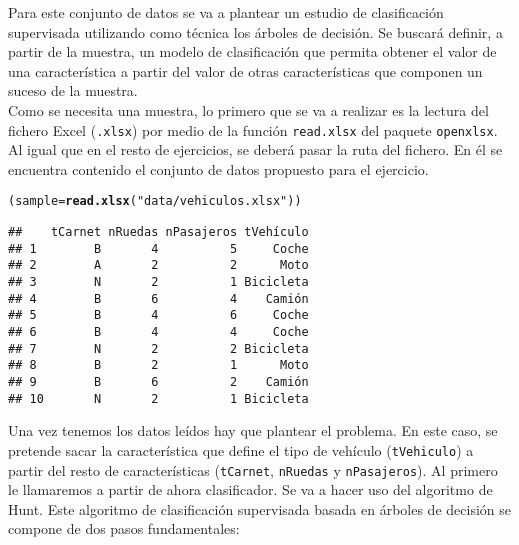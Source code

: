 \documentclass[12pt]{report}\usepackage[]{graphicx}\usepackage[dvipsnames]{xcolor}
\makeatletter
\newcommand{\hlstr}[1]{\textcolor[rgb]{0.192,0.494,0.8}{#1}}%
\newcommand{\hlstd}[1]{\textcolor[rgb]{0.345,0.345,0.345}{#1}}%
\newcommand{\hlkwb}[1]{\textcolor[rgb]{0.69,0.353,0.396}{#1}}%
\newcommand{\hlkwd}[1]{\textcolor[rgb]{0.737,0.353,0.396}{\textbf{#1}}}%
\newenvironment{kframe}{%
 \def\at@end@of@kframe{}%
 \ifinner\ifhmode%
  \def\at@end@of@kframe{\end{minipage}}%
  \begin{minipage}{\columnwidth}%
 \fi\fi%
 \def\FrameCommand##1{\hskip\@totalleftmargin \hskip-\fboxsep
 \colorbox{shadecolor}{##1}\hskip-\fboxsep
     \hskip-\linewidth \hskip-\@totalleftmargin \hskip\columnwidth}%
 \MakeFramed {\advance\hsize-\width
   \@totalleftmargin\z@ \linewidth\hsize
   \@setminipage}}%
 {\par\unskip\endMakeFramed%
 \at@end@of@kframe}
\newenvironment{knitrout}{}{} %
\makeatother
\begin{document}
	 			Para este conjunto de datos se va a plantear un estudio de clasificación supervisada utilizando como técnica los árboles de decisión. Se buscará definir, a partir de la muestra, un modelo de clasificación que permita obtener el valor de una característica a partir del valor de otras características que componen un suceso de la muestra. \\
	 			
	 			Como se necesita una muestra, lo primero que se va a realizar es la lectura del fichero Excel (\texttt{.xlsx}) por medio de la función \texttt{read.xlsx} del paquete \texttt{openxlsx}. Al igual que en el resto de ejercicios, se deberá pasar la ruta del fichero. En él se encuentra contenido el conjunto de datos propuesto para el ejercicio.
	 			
\begin{knitrout}
\color{fgcolor}\begin{kframe}
\begin{alltt}
\hlstd{(sample} \hlkwb{=} \hlkwd{read.xlsx}\hlstd{(}\hlstr{"data/vehiculos.xlsx"}\hlstd{))}
\end{alltt}
\begin{verbatim}
##    tCarnet nRuedas nPasajeros tVehículo
## 1        B       4          5     Coche
## 2        A       2          2      Moto
## 3        N       2          1 Bicicleta
## 4        B       6          4    Camión
## 5        B       4          6     Coche
## 6        B       4          4     Coche
## 7        N       2          2 Bicicleta
## 8        B       2          1      Moto
## 9        B       6          2    Camión
## 10       N       2          1 Bicicleta
\end{verbatim}
\end{kframe}
\end{knitrout}
	 			
	 			Una vez tenemos los datos leídos hay que plantear el problema. En este caso, se pretende sacar la característica que define el tipo de vehículo (\texttt{tVehiculo}) a partir del resto de características (\texttt{tCarnet}, \texttt{nRuedas} y \texttt{nPasajeros}). Al primero le llamaremos a partir de ahora clasificador. Se va a hacer uso del algoritmo de Hunt. Este algoritmo de clasificación supervisada basada en árboles de decisión se compone de dos pasos fundamentales:
	 			
\end{document}
